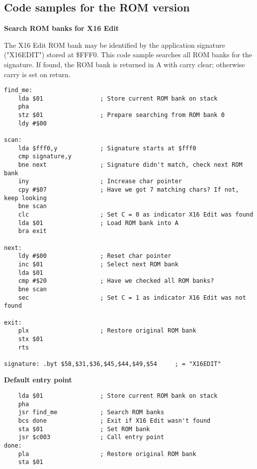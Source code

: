 \documentclass{article}
\begin{document}
    \subsection{Code samples for the ROM version}
    
    \textbf{Search ROM banks for X16 Edit}

    The X16 Edit ROM bank may be identified by the
    application signature ("X16EDIT") stored at \$FFF0. This
    code sample searches all ROM banks for the signature.
    If found, the ROM bank is returned in A with carry clear; otherwise
    carry is set on return.

\begin{verbatim}
find_me:
    lda $01                ; Store current ROM bank on stack
    pha
    stz $01                ; Prepare searching from ROM bank 0
    ldy #$00

scan:
    lda $fff0,y            ; Signature starts at $fff0
    cmp signature,y
    bne next               ; Signature didn't match, check next ROM bank
    iny                    ; Increase char pointer
    cpy #$07               ; Have we got 7 matching chars? If not, keep looking
    bne scan
    clc                    ; Set C = 0 as indicator X16 Edit was found
    lda $01                ; Load ROM bank into A
    bra exit

next:
    ldy #$00               ; Reset char pointer
    inc $01                ; Select next ROM bank
    lda $01            
    cmp #$20               ; Have we checked all ROM banks?
    bne scan
    sec                    ; Set C = 1 as indicator X16 Edit was not found

exit:
    plx                    ; Restore original ROM bank
    stx $01
    rts

signature: .byt $58,$31,$36,$45,$44,$49,$54     ; = "X16EDIT"
\end{verbatim}

    \textbf{Default entry point}
\begin{verbatim}
    lda $01                ; Store current ROM bank on stack
    pha
    jsr find_me            ; Search ROM banks
    bcs done               ; Exit if X16 Edit wasn't found
    sta $01                ; Set ROM bank
    jsr $c003              ; Call entry point
done:
    pla                    ; Restore original ROM bank
    sta $01
\end{verbatim}
\end{document}
